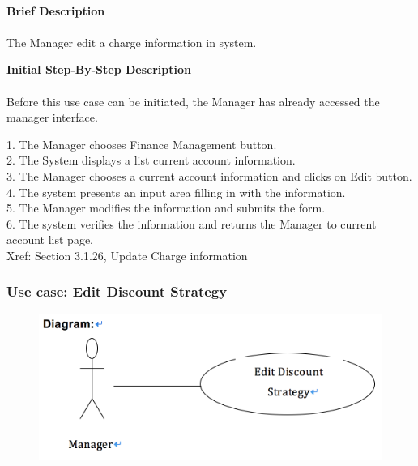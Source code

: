 \documentclass[12pt]{report}
\begin{document}
\paragraph{}
\begin{flushleft}
\textbf{Brief Description }
\paragraph{}
The Manager edit a charge information in system. \\

\begin{flushleft}
\textbf{Initial Step-By-Step Description }
\paragraph{}
Before this use case can be initiated, the Manager has already accessed the manager interface.

\begin{flushleft}
1.	The Manager chooses Finance Management button.  \\
2.	The System displays a list current account information. \\
3.	The Manager chooses a current account information and clicks on Edit button. \\
4.	The system presents an input area filling in with the information. \\
5.	The Manager modifies the information and submits the form. \\
6.	The system verifies the information and returns the Manager to current account list page. \\
Xref: Section 3.1.26, Update Charge information

\end{flushleft}
\end{flushleft}
\end{flushleft}

\newpage
\subsubsection{Use case:  Edit Discount Strategy }

\begin{figure}[!htb]
  \includegraphics{213.PNG}
\end{figure}
\end{document}
